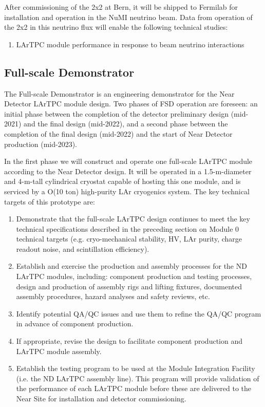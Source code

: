 After commissioning of the 2x2 at Bern, it will be shipped to Fermilab for installation and operation in the NuMI neutrino beam.  
Data from operation of the 2x2 in this neutrino flux will enable the following technical studies:
\begin{enumerate}
    \item LArTPC module performance in response to beam neutrino interactions
\end{enumerate}

\subsection{Full-scale Demonstrator}

The Full-scale Demonstrator is an engineering demonstrator for the Near Detector LArTPC module design.  
Two phases of FSD operation are foreseen: an initial phase between the completion of the detector preliminary design (mid-2021) and the final design (mid-2022), and a second phase between the completion of the final design (mid-2022) and the start of Near Detector production (mid-2023).

In the first phase we will construct and operate one full-scale LArTPC module according to the Near Detector design.  
It will be operated in a 1.5-m-diameter and 4-m-tall cylindrical cryostat capable of hosting this one module, and is serviced by a O(10 ton) high-purity LAr cryogenics system.  
The key technical targets of this prototype are:
\begin{enumerate}
    \item Demonstrate that the full-scale LArTPC design continues to meet the key technical specifications described in the preceding section on Module 0 technical targets (e.g. cryo-mechanical stability, HV, LAr purity, charge readout noise, and scintillation efficiency).
    \item Establish and exercise the production and assembly processes for the ND LArTPC modules, including: component production and testing processes, design and production of assembly rigs and lifting fixtures, documented assembly procedures, hazard analyses and safety reviews, etc.
    \item Identify potential QA/QC issues and use them to refine the QA/QC program in advance of component production.
    \item If appropriate, revise the design to facilitate component production and LArTPC module assembly.
    \item Establish the testing program to be used at the Module Integration Facility (i.e. the ND LArTPC assembly line).  This program will provide validation of the performance of each LArTPC module before these are delivered to the Near Site for installation and detector commissioning. 
\end{enumerate}

